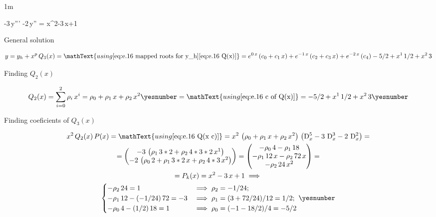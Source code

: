 \documentclass["AM3C-Slides_annotations.tex"]{subfiles}
\begin{document}
\begin{exampleBox}1m{} %
  \begin{BM}
    -3\,y'''
    -2\,y''
    = x^2-3\,x+1
  \end{BM}

  \answer{}

  General solution
  \begin{tcolorbox}
    \begin{gather*}
      y
      = y_h + x^p\,Q_3(x)
      = \mathText{using 
        \eqref{eq:e.16 mapped roots for y_h}
        \eqref{eq:e.16 Q(x)}
      }
      = e^{ 0\,x}\,(c_0 + c_1\,x)
      + e^{-1\,x}\,(c_2 + c_3\,x)
      + e^{-2\,x}\,(c_4)
      - 5/2 
      + x^1\,1/2 
      + x^2\,3
    \end{gather*}
  \end{tcolorbox}

  Finding \(Q_2(x)\)
  \begin{tcolorbox}
    \begin{gather*}
      Q_2(x)
      = \sum_{i=0}^{2}{\rho_i\,x^i}
      = \rho_0+\rho_1\,x+\rho_2\,x^2
      \yesnumber\label{eq:e.16 Q(x c)}
      = \mathText{using \eqref{eq:e.16 c of Q(x)}}
      = -5/2 
      +x^1\,1/2 
      +x^2\,3
      \yesnumber\label{eq:e.16 Q(x)}
    \end{gather*}
  \end{tcolorbox}

  Finding coeficients of \(Q_3(x)\)
  \begin{tcolorbox}
    \begin{gather*}
      x^2\,Q_2(x)\,P(x)
      = \mathText{using \eqref{eq:e.16 Q(x c)}}
      = x^2
      \,\left(\rho_0+\rho_1\,x+\rho_2\,x^2\right)
      \,\left(\mdif[5]{x} -3\,\mdif[3]{x} -2\,\mdif[2]{x}\right)
      = \\
      = \begin{pmatrix}
      - 3\,\left(\rho_1\,3*2+\rho_2\,4*3*2\,x^1\right)
      \\ - 2\,\left(\rho_0\,2+\rho_1\,3*2\,x+\rho_2\,4*3\,x^2\right)
      \end{pmatrix}
      = \begin{pmatrix}
      -\rho_0\,4
      -\rho_1\,18
      \\
      -\rho_1\,12\,x
      -\rho_2\,72\,x
      \\
      -\rho_2\,24\,x^2
      \end{pmatrix}
      = \\
      = P_k(x)
      = x^2-3\,x+1
      \implies \\
      \begin{cases}
        -\rho_2\,24 = 1
        &\implies \rho_2 = -1/24
        ; \\
        -\rho_1\,12
        -(-1/24)\,72
        =-3
        &\implies 
        \rho_1
        = ( 3 + 72/24 )/12
        = 1/2 
        ; \\
        -\rho_0\,4
        -(1/2)\,18
        = 1
        &\implies
        \rho_0 
        = (-1-18/2)/4
        = -5/2 
      \end{cases}
      \yesnumber\label{eq:e.16 c of Q(x)}
    \end{gather*}
  \end{tcolorbox}


\end{exampleBox}
\end{document}
